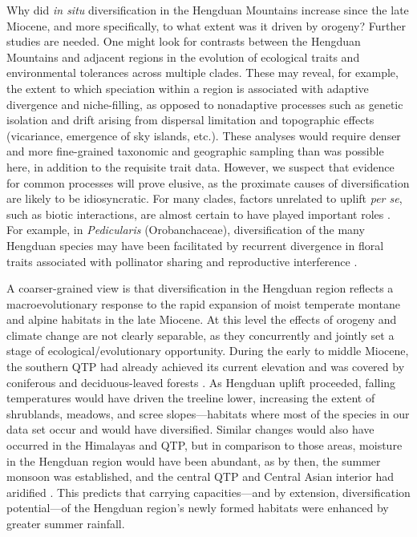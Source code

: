 Why did \textit{in situ} diversification in the Hengduan Mountains increase since the late Miocene, and more specifically, to what extent was it driven by orogeny? Further studies are needed. One might look for contrasts between the Hengduan Mountains and adjacent regions in the evolution of ecological traits and environmental tolerances \citep[e.g.,][]{liu2016} across multiple clades. These may reveal, for example, the extent to which speciation within a region is associated with adaptive divergence and niche-filling, as opposed to nonadaptive processes such as genetic isolation and drift arising from dispersal limitation and topographic effects (vicariance, emergence of sky islands, etc.). These analyses would require denser and more fine-grained taxonomic and geographic sampling than was possible here, in addition to the requisite trait data. However, we suspect that evidence for common processes will prove elusive, as the proximate causes of diversification are likely to be idiosyncratic. For many clades, factors unrelated to uplift \emph{per se}, such as biotic interactions, are almost certain to have played important roles \citep{Luebert2014,Wen2014,Renner2016}. For example, in \emph{Pedicularis} (Orobanchaceae), diversification of the many Hengduan species may have been facilitated by recurrent divergence in floral traits associated with pollinator sharing and reproductive interference \citep[e.g.,][]{eaton2012}.


A coarser-grained view is that diversification in the Hengduan region reflects a macroevolutionary response to the rapid expansion of moist temperate montane and alpine habitats in the late Miocene. At this level the effects of orogeny and climate change are not clearly separable, as they concurrently and jointly set a stage of ecological/evolutionary opportunity. During the early to middle Miocene, the southern QTP had already achieved its current elevation \citep{Spicer2003} and was covered by coniferous and deciduous-leaved forests \citep{SunJ2014,LiH1976}%
. As Hengduan uplift proceeded, falling temperatures would have driven the treeline lower, increasing the extent of shrublands, meadows, and scree slopes---habitats where most of the species in our data set occur and would have diversified. Similar changes would also have occurred in the Himalayas and QTP, but in comparison to those areas, moisture in the Hengduan region would have been abundant, as by then, the summer monsoon was established, and the central QTP and Central Asian interior had aridified \citep[see][]{Renner2016}. This predicts that carrying capacities---and by extension, diversification potential---of the Hengduan region's newly formed habitats were enhanced by greater summer rainfall. 

